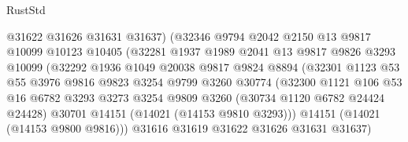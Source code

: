 \begin{lexlean}{RustStd}
\begin{coremodule}
                              @31622
                              @31626
                              @31631
                              @31637)
                            (@32346
                              @9794
                              @2042
                              @2150
                              @13
                              @9817
                              @10099
                              @10123
                              @10405
                              (@32281
                                @1937
                                @1989
                                @2041
                                @13
                                @9817
                                @9826
                                @3293
                                @10099
                                (@32292
                                  @1936
                                  @1049
                                  @20038
                                  @9817
                                  @9824
                                  @8894
                                  (@32301
                                    @1123
                                    @53
                                    @55
                                    @3976
                                    @9816
                                    @9823
                                    @3254
                                    @9799
                                    @3260
                                    @30774
                                    (@32300
                                      @1121
                                      @106
                                      @53
                                      @16
                                      @6782
                                      @3293
                                      @3273
                                      @3254
                                      @9809
                                      @3260
                                      (@30734 @1120 @6782 @24424 @24428)
                                      @30701
                                      @14151
                                      (@14021 (@14153 @9810 @3293)))
                                    @14151
                                    (@14021 (@14153 @9800 @9816)))
                                  @31616
                                  @31619
                                  @31622
                                  @31626
                                  @31631
                                  @31637)

\end{coremodule}
\end{lexlean}

